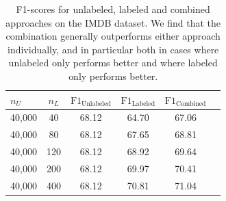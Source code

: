 \begin{table}[t]
\vskip 0.15in
\renewcommand{\arraystretch}{1.25} %
\begin{center}
\begin{small}
\begin{tabular}{lccccr}
\hline
$n_U$ & $n_L$ & $\text{F1}_\text{Unlabeled}$ & $\text{F1}_\text{Labeled}$ &  $\text{F1}_\text{Combined}$ \\
\hline
40,000 & 40 & 68.12 & 64.70 & 67.06 \\
40,000 & 80 & 68.12 & 67.65 & 68.81 \\
40,000 & 120 & 68.12 & 68.92 & 69.64 \\
40,000 & 200 & 68.12 & 69.97 & 70.41 \\
40,000 & 400 & 68.12 & 70.81 & 71.04 \\
\hline
\end{tabular}
\end{small}
\end{center}
\vskip -0.1in
\caption{F1-scores for unlabeled, labeled and combined approaches on the IMDB dataset. We find that the combination generally outperforms either approach individually, and in particular both in cases where unlabeled only performs better and where labeled only performs better.}
\label{tab:real_combo}
\end{table}



